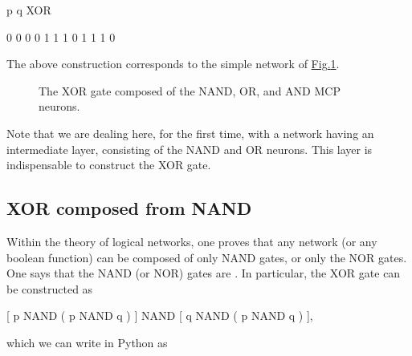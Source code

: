 \documentclass[letterpaper,10pt,english]{jupyterBook}
\let\sphinxpxdimen\pdfpxdimen\else\newdimen\sphinxpxdimen
\begin{document}
\begin{sphinxVerbatim}[commandchars=\\\{\}]
p q XOR

0 0  0
0 1  1
1 0  1
1 1  0
\end{sphinxVerbatim}

\sphinxAtStartPar
The above construction corresponds to the simple network of \hyperref[\detokenize{docs/mcp:xor-fig}]{Fig.\@ \ref{\detokenize{docs/mcp:xor-fig}}}.

\begin{figure}[htbp]
\centering
\capstart

\noindent\sphinxincludegraphics[width=260\sphinxpxdimen]{{xor}.png}
\caption{The XOR gate composed of the NAND, OR, and AND MCP neurons.}\label{\detokenize{docs/mcp:xor-fig}}\end{figure}

\sphinxAtStartPar
Note that we are dealing here, for the first time, with a network having an intermediate layer, consisting of the NAND and OR neurons. This layer is indispensable to construct the XOR gate.


\subsection{XOR composed from NAND}
\label{\detokenize{docs/mcp:xor-composed-from-nand}}
\sphinxAtStartPar
Within the theory of logical networks, one proves that any network (or any boolean function) can be composed of only NAND gates, or only the NOR gates. One says that the NAND (or NOR) gates are . In particular, the XOR gate can be constructed as

\sphinxAtStartPar
{[} p NAND ( p NAND q ) {]} NAND {[} q NAND ( p NAND q ) {]},

\sphinxAtStartPar
which we can write in Python as

\begin{sphinxVerbatim}[commandchars=\\\{\}]
   
\end{sphinxVerbatim}
\end{document}
